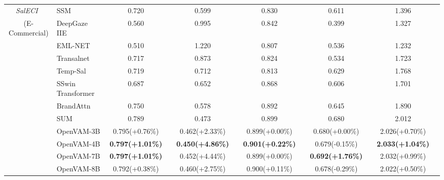 \begin{table}[t]
{\begin{tabular}{c|lcccccccccc}
    \textit{SalECI}~\cite{jiang2022does}
    & SSM~\cite{cornia2018predicting} & 0.720 && 0.599 && 0.830 && 0.611 && 1.396 & \\
    (E-Commercial)
    & DeepGaze IIE~\cite{linardos2021deepgaze} & 0.560 && 0.995 && 0.842 && 0.399 && 1.327 & \\
    & EML-NET~\cite{jiang2023ueyes} & 0.510 && 1.220 && 0.807 && 0.536 && 1.232 & \\
    & Transalnet~\cite{jiang2023ueyes} & 0.717 && 0.873 && 0.824 && 0.534 && 1.723 & \\
    & Temp-Sal~\cite{aydemir2023tempsal} & 0.719 && 0.712 && 0.813 && 0.629 && 1.768 & \\
    & SSwin Transformer~\cite{jiang2022does} & 0.687 && 0.652 && 0.868 && 0.606 && 1.701 & \\
    & BrandAttn~\cite{hosseini2024brand} & 0.750 && 0.578 && 0.892 && 0.645 && 1.890 & \\
    & SUM~\cite{hosseini2025sum} & 0.789 && 0.473 && 0.899 && 0.680 && 2.012 & \\
    \cmidrule{2-12}
    & \cellcolor[HTML]{DADCFF}OpenVAM-3B
    & \cellcolor[HTML]{DADCFF}0.795\scriptsize{(+0.76\%)} && 
      \cellcolor[HTML]{DADCFF}0.462\scriptsize{(+2.33\%)} && 
      \cellcolor[HTML]{DADCFF}0.899\scriptsize{(+0.00\%)} && 
      \cellcolor[HTML]{DADCFF}0.680\scriptsize{(+0.00\%)} && 
      \cellcolor[HTML]{DADCFF}2.026\scriptsize{(+0.70\%)} & \\
    & \cellcolor[HTML]{DADCFF}OpenVAM-4B
    & \cellcolor[HTML]{DADCFF}\textbf{0.797\scriptsize{(+1.01\%)}} && 
      \cellcolor[HTML]{DADCFF}\textbf{0.450\scriptsize{(+4.86\%)}} && 
      \cellcolor[HTML]{DADCFF}\textbf{0.901\scriptsize{(+0.22\%)}} && 
      \cellcolor[HTML]{DADCFF}0.679\scriptsize{(-0.15\%)} && 
      \cellcolor[HTML]{DADCFF}\textbf{2.033\scriptsize{(+1.04\%)}} & \\
    & \cellcolor[HTML]{DADCFF}OpenVAM-7B
    & \cellcolor[HTML]{DADCFF}\textbf{0.797\scriptsize{(+1.01\%)}} && 
      \cellcolor[HTML]{DADCFF}0.452\scriptsize{(+4.44\%)} && 
      \cellcolor[HTML]{DADCFF}0.899\scriptsize{(+0.00\%)} && 
      \cellcolor[HTML]{DADCFF}\textbf{0.692\scriptsize{(+1.76\%)}} && 
      \cellcolor[HTML]{DADCFF}2.032\scriptsize{(+0.99\%)} & \\
    & \cellcolor[HTML]{DADCFF}OpenVAM-8B
    & \cellcolor[HTML]{DADCFF}0.792\scriptsize{(+0.38\%)} && 
      \cellcolor[HTML]{DADCFF}0.460\scriptsize{(+2.75\%)} && 
      \cellcolor[HTML]{DADCFF}0.900\scriptsize{(+0.11\%)} && 
      \cellcolor[HTML]{DADCFF}0.678\scriptsize{(-0.29\%)} && 
      \cellcolor[HTML]{DADCFF}2.022\scriptsize{(+0.50\%)} & \\
    \midrule
    

\end{tabular}}
\end{table}

